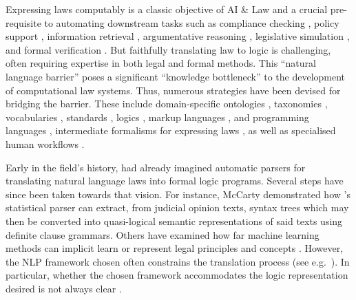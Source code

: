\documentclass{IOS-Book-Article}
\begin{document}
Expressing laws computably is a classic objective of AI \& Law \cite{mccarty_reflections_1977, sergot_british_1986} and a crucial pre-requisite to automating downstream tasks such as compliance checking \cite{palmirani_modelling_2018, hickey_gdpr_2021}, policy support \cite{svensson_expertisze_1992, haan_tracs_1992}, information retrieval \cite{bing_designing_1987}, argumentative reasoning \cite{mochales_study_2008}, legislative simulation \cite{bench-capon_logic_1987, bench-capon_support_1992}, and formal verification \cite{haan_tracs_1992}. But faithfully translating law to logic is challenging, often requiring expertise in both legal and formal methods. This ``natural language barrier'' \cite{mccarty_deep_2007} poses a significant ``knowledge bottleneck'' \cite{nazarenko_pragmatic_2021} to the development of computational law systems. Thus, numerous strategies have been devised for bridging the barrier. These include domain-specific ontologies \cite{palmirani_legal_2018}, taxonomies \cite{hulstijn_taxonomy_2020}, vocabularies \cite{hickey_gdpr_2021}, standards \cite{sartor_akoma-ntoso_2011}, logics \cite{prakken_logical_1993}, markup languages \cite{athan_oasis_2013}, and programming languages \cite{huttner_catala_2022}, intermediate formalisms for expressing laws \cite{mccarty_language_1989, kralingen_norm_1993, mccarty_deep_2007}, as well as specialised human workflows \cite{palmirani_legal_2018, witt_converting_2021}.

Early in the field's history, \cite{bing_designing_1987} had already imagined automatic parsers for translating natural language laws into formal logic programs. Several steps have since been taken towards that vision. For instance, McCarty \cite{mccarty_deep_2007} demonstrated how \cite{collins_head-driven_2003}'s statistical parser can extract, from judicial opinion texts, syntax trees which may then be converted into quasi-logical semantic representations of said texts using definite clause grammars. Others have examined how far machine learning methods can implicit learn or represent legal principles and concepts \cite{groendijk_neural_1992, de_maat_automatic_2008, winkels_automatic_2012, chalkidis_neural_2019, chalkidis_lexglue_2022}. However, the NLP framework chosen often constrains the translation process (see e.g.\ \cite{quaresma_question_2005}). In particular, whether the chosen framework accommodates the logic representation desired is not always clear \cite{wyner_study_2013}.
\end{document}
